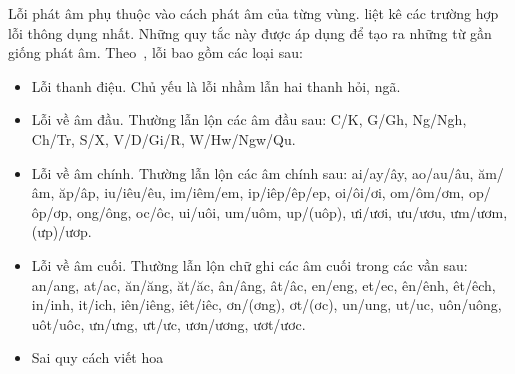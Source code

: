 \documentclass[a4paper,oneside,14pt]{extbook} %
\begin{document}
Lỗi phát âm phụ thuộc vào cách phát âm của từng
vùng. \cite{LoiChinhTa} liệt kê các trường hợp lỗi thông dụng
nhất. Những quy tắc này được áp dụng để tạo ra những từ gần giống phát
âm.
Theo~\cite{LoiChinhTa}, lỗi bao gồm các loại sau:
\begin{itemize}
\item Lỗi thanh điệu. Chủ yếu là lỗi nhầm lẫn hai thanh hỏi, ngã.
\item Lỗi về âm đầu. Thường lẫn lộn các âm đầu sau: C/K, G/Gh, Ng/Ngh,
  Ch/Tr, S/X, V/D/Gi/R, W/Hw/Ngw/Qu.
\item Lỗi về âm chính. Thường lẫn lộn các âm chính sau: ai/ay/ây,
  ao/au/âu, ăm/âm, ăp/âp, iu/iêu/êu, im/iêm/em, ip/iêp/êp/ep,
  oi/ôi/ơi, om/ôm/ơm, op/ôp/ơp, ong/ông, oc/ôc, ui/uôi, um/uôm, up/(uôp),
  ưi/ươi, ưu/ươu, ưm/ươm, (ưp)/ươp.
\item Lỗi về âm cuối. Thường lẫn lộn chữ ghi các âm cuối trong các vần
  sau:
  an/ang, at/ac, ăn/ăng, ăt/ăc, ân/âng, ât/âc, en/eng, et/ec, ên/ênh,
  êt/êch, in/inh, it/ich, iên/iêng, iêt/iêc, ơn/(ơng), ơt/(ơc),
  un/ung, ut/uc, uôn/uông, uôt/uôc, ưn/ưng, ưt/ưc, ươn/ương, ươt/ươc.
\item Sai quy cách viết hoa
\end{itemize}
\end{document}
